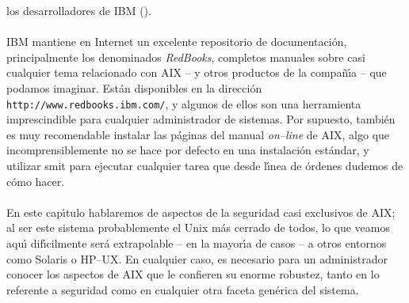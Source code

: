 los desarrolladores de IBM (\cite{kn:bet00}).\\
\\IBM mantiene en Internet un excelente repositorio de documentaci\'on,
principalmente los denominados {\it RedBooks}, completos manuales sobre casi 
cualquier tema relacionado con AIX -- y otros productos de la compa\~n\'{\i}a --
que podamos imaginar. Est\'an disponibles en la direcci\'on {\tt 
http://www.redbooks.ibm.com/}, y algunos de ellos son una herramienta 
imprescindible para cualquier administrador de sistemas. Por supuesto, 
tambi\'en es muy recomendable instalar las p\'aginas del manual {\it on--line}
de AIX, algo que incomprensiblemente no se hace por defecto en una instalaci\'on
est\'andar, y utilizar {\sc smit} para ejecutar cualquier tarea que desde 
l\'{\i}nea de \'ordenes dudemos de c\'omo hacer.\\
\\En este cap\'{\i}tulo hablaremos de aspectos de la seguridad casi exclusivos
de AIX; al ser este sistema probablemente el Unix m\'as cerrado de todos, lo
que veamos aqu\'{\i} dif\'{\i}cilmente ser\'a extrapolable -- en la mayor\'{\i}a
de casos -- a otros entornos como Solaris o HP--UX. En cualquier caso, es
necesario para un administrador conocer los aspectos de AIX que le confieren su
enorme robustez, tanto en lo referente a seguridad como en cualquier otra faceta
gen\'erica del sistema.
